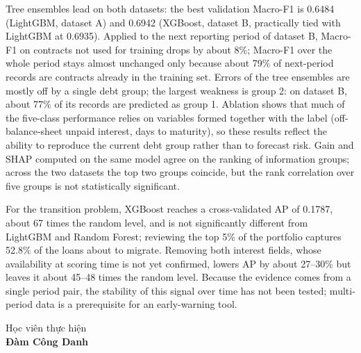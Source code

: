 Tree ensembles lead on both datasets: the best validation Macro-F1 is 0.6484 (LightGBM, dataset A) and 0.6942 (XGBoost, dataset B, practically tied with LightGBM at 0.6935). Applied to the next reporting period of dataset B, Macro-F1 on contracts not used for training drops by about 8\%; Macro-F1 over the whole period stays almost unchanged only because about 79\% of next-period records are contracts already in the training set. Errors of the tree ensembles are mostly off by a single debt group; the largest weakness is group 2: on dataset B, about 77\% of its records are predicted as group 1. Ablation shows that much of the five-class performance relies on variables formed together with the label (off-balance-sheet unpaid interest, days to maturity), so these results reflect the ability to reproduce the current debt group rather than to forecast risk. Gain and SHAP computed on the same model agree on the ranking of information groups; across the two datasets the top two groups coincide, but the rank correlation over five groups is not statistically significant.

For the transition problem, XGBoost reaches a cross-validated AP of 0.1787, about 67 times the random level, and is not significantly different from LightGBM and Random Forest; reviewing the top 5\% of the portfolio captures 52.8\% of the loans about to migrate. Removing both interest fields, whose availability at scoring time is not yet confirmed, lowers AP by about 27--30\% but leaves it about 45--48 times the random level. Because the evidence comes from a single period pair, the stability of this signal over time has not been tested; multi-period data is a prerequisite for an early-warning tool.

\newpage
\begin{center}
   \hspace{9.5cm}  Học viên thực hiện\\
 \vspace{2 cm}
   \hspace{9.5cm} \bf Đàm Công Danh
\end{center}

